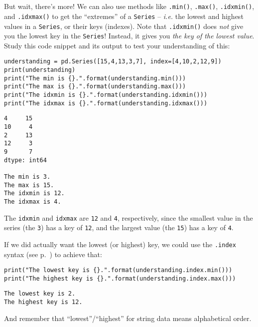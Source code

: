 
\chapter[Associative arrays in Python (3 of 3)]{\huge\selectfont{Associative
arrays in Python (3 of 3)}}
\label{ch:assocArraysInPython3}


But wait, there's more! We can also use methods like \texttt{.min()},
\texttt{.max()}, \texttt{.idxmin()}, and \texttt{.idxmax()} to get the
``extremes'' of a \texttt{Series} -- \textit{i.e.} the lowest and highest
values in a \texttt{Series}, or their keys (indexes). Note that
\texttt{.idxmin()} does \textit{not} give you the lowest key in the
\texttt{Series}! Instead, it gives you \textit{the key of the lowest value}.
Study this code snippet and its output to test your understanding of this:

\begin{Verbatim}[fontsize=\small,samepage=true,frame=single,framesep=3mm]
understanding = pd.Series([15,4,13,3,7], index=[4,10,2,12,9])
print(understanding)
print("The min is {}.".format(understanding.min()))
print("The max is {}.".format(understanding.max()))
print("The idxmin is {}.".format(understanding.idxmin()))
print("The idxmax is {}.".format(understanding.idxmax()))
\end{Verbatim}

\begin{Verbatim}[fontsize=\small,samepage=true,frame=leftline,framesep=5mm,framerule=1mm]
4     15
10     4
2     13
12     3
9      7
dtype: int64

The min is 3.
The max is 15.
The idxmin is 12.
The idxmax is 4.
\end{Verbatim}

The \texttt{idxmin} and \texttt{idxmax} are \texttt{12} and \texttt{4},
respectively, since the smallest value in the series (the \texttt{3}) has a key
of \texttt{12}, and the largest value (the \texttt{15}) has a key of
\texttt{4}.


If we did actually want the lowest (or highest) key, we could use the
\texttt{.index} syntax (see p.~\pageref{dotIndex}) to achieve that:

\begin{Verbatim}[fontsize=\small,samepage=true,frame=single,framesep=3mm]
print("The lowest key is {}.".format(understanding.index.min()))
print("The highest key is {}.".format(understanding.index.max()))
\end{Verbatim}

\begin{Verbatim}[fontsize=\small,samepage=true,frame=leftline,framesep=5mm,framerule=1mm]
The lowest key is 2.
The highest key is 12.
\end{Verbatim}

And remember that ``lowest''/``highest'' for string data means alphabetical
order.

